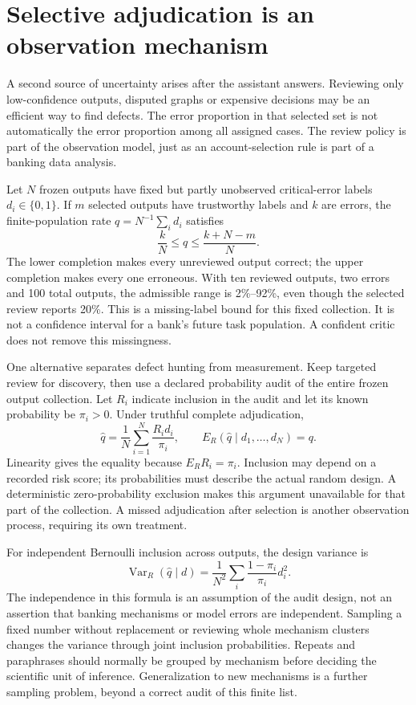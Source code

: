 \section{Selective adjudication is an observation mechanism}
\label{exec14:l7-adjudication}

A second source of uncertainty arises after the assistant answers. Reviewing
only low-confidence outputs, disputed graphs or expensive decisions may be
an efficient way to find defects. The error proportion in that selected set
is not automatically the error proportion among all assigned cases. The
review policy is part of the observation model, just as an account-selection
rule is part of a banking data analysis.

Let \(N\) frozen outputs have fixed but partly unobserved critical-error
labels \(d_i\in\{0,1\}\). If \(m\) selected outputs have trustworthy labels
and \(k\) are errors, the finite-population rate \(q=N^{-1}\sum_i d_i\)
satisfies
\[
              \frac{k}{N}\leq q\leq\frac{k+N-m}{N}.
\]
The lower completion makes every unreviewed output correct; the upper
completion makes every one erroneous. With ten reviewed outputs, two
errors and 100 total outputs, the admissible range is 2\%--92\%, even though
the selected review reports 20\%. This is a missing-label bound for this
fixed collection. It is not a confidence interval for a bank's future task
population. A confident critic does not remove this missingness.

One alternative separates defect hunting from measurement. Keep targeted
review for discovery, then use a declared probability audit of the entire
frozen output collection. Let \(R_i\) indicate inclusion in the audit and
let its known probability be \(\pi_i>0\). Under truthful complete
adjudication,
\[
 \widehat q=\frac1N\sum_{i=1}^N\frac{R_i d_i}{\pi_i},
 \qquad
 E_R(\widehat q\mid d_1,\ldots,d_N)=q.
\]
Linearity gives the equality because \(E_R R_i=\pi_i\). Inclusion may depend
on a recorded risk score; its probabilities must describe the actual random
design. A deterministic zero-probability exclusion makes this argument
unavailable for that part of the collection. A missed adjudication after
selection is another observation process, requiring its own treatment.

For independent Bernoulli inclusion across outputs, the design variance is
\[
 \operatorname{Var}_R(\widehat q\mid d)
 =\frac1{N^2}\sum_i\frac{1-\pi_i}{\pi_i}d_i^2.
\]
The independence in this formula is an assumption of the audit design,
not an assertion that banking mechanisms or model errors are independent.
Sampling a fixed number without replacement or reviewing whole mechanism
clusters changes the variance through joint inclusion probabilities.
Repeats and paraphrases should normally be grouped by mechanism before
deciding the scientific unit of inference. Generalization to new mechanisms
is a further sampling problem, beyond a correct audit of this finite list.

